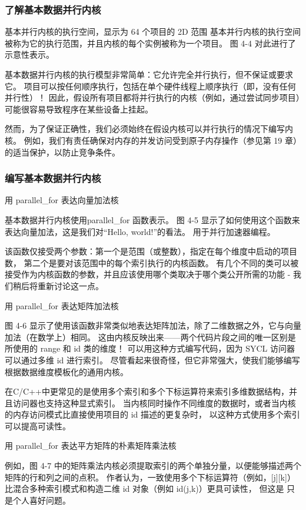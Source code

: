 \subsubsection{了解基本数据并行内核}
{\color{red} 基本并行内核的执行空间，显示为 64 个项目的 2D 范围}
基本并行内核的执行空间被称为它的执行范围，并且内核的每个实例被称为一个项目。 图 4-4 对此进行了示意性表示。

基本数据并行内核的执行模型非常简单：它允许完全并行执行，但不保证或要求它。 
项目可以按任何顺序执行，包括在单个硬件线程上顺序执行（即，没有任何并行性）！ 
因此，假设所有项目都将并行执行的内核（例如，通过尝试同步项目）可能很容易导致程序在某些设备上挂起。

然而，为了保证正确性，我们必须始终在假设内核可以并行执行的情况下编写内核。 
例如，我们有责任确保对内存的并发访问受到原子内存操作（参见第 19 章）的适当保护，以防止竞争条件。

\subsubsection{编写基本数据并行内核}
{\color{red} 用 parallel\_for 表达向量加法核 }

基本数据并行内核使用parallel\_for 函数表示。 
图 4-5 显示了如何使用这个函数来表达向量加法，这是我们对“Hello, world!”的看法。 用于并行加速器编程。

该函数仅接受两个参数：第一个是范围（或整数），指定在每个维度中启动的项目数，
第二个是要对该范围中的每个索引执行的内核函数。 
有几个不同的类可以被接受作为内核函数的参数，并且应该使用哪个类取决于哪个类公开所需的功能 - 我们稍后将重新讨论这一点。

{\color{red} 用 parallel\_for 表达矩阵加法核}

图 4-6 显示了使用该函数非常类似地表达矩阵加法，除了二维数据之外，它与向量加法（在数学上）相同。 
这由内核反映出来——两个代码片段之间的唯一区别是所使用的 range 和 id 类的维度！ 
可以用这种方式编写代码，因为 SYCL 访问器可以通过多维 id 进行索引。 
尽管看起来很奇怪，但它非常强大，使我们能够编写根据数据维度模板化的通用内核。

在C/C++中更常见的是使用多个索引和多个下标运算符来索引多维数据结构，并且访问器也支持这种显式索引。 
当内核同时操作不同维度的数据时，或者当内核的内存访问模式比直接使用项目的 id 描述的更复杂时，
以这种方式使用多个索引可以提高可读性。

{\color{red} 用 parallel\_for 表达平方矩阵的朴素矩阵乘法核 }

例如，图 4-7 中的矩阵乘法内核必须提取索引的两个单独分量，以便能够描述两个矩阵的行和列之间的点积。 
作者认为，一致使用多个下标运算符（例如，[j][k]）比混合多种索引模式和构造二维 id 对象（例如 id(j,k)）更具可读性，
但这是 只是个人喜好问题。

